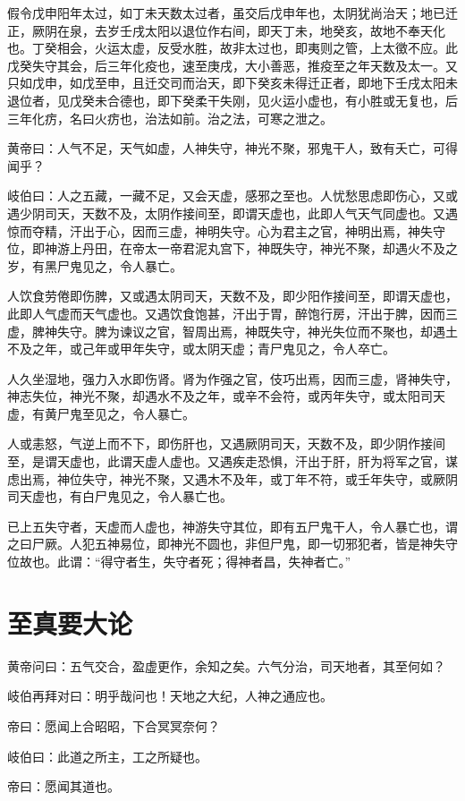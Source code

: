 \documentclass{article}%
\begin{document}
假令戊申阳年太过，如丁未天数太过者，虽交后戊申年也，太阴犹尚治天；地已迁正，厥阴在泉，去岁壬戌太阳以退位作右间，即天丁未，地癸亥，故地不奉天化也。丁癸相会，火运太虚，反受水胜，故非太过也，即夷则之管，上太徵不应。此戊癸失守其会，后三年化疫也，速至庚戌，大小善恶，推疫至之年天数及太一。又只如戊申，如戊至申，且迁交司而治天，即下癸亥未得迁正者，即地下壬戌太阳未退位者，见戊癸未合德也，即下癸柔干失刚，见火运小虚也，有小胜或无复也，后三年化疠，名曰火疠也，治法如前。治之法，可寒之泄之。

黄帝曰：人气不足，天气如虚，人神失守，神光不聚，邪鬼干人，致有夭亡，可得闻乎？

岐伯曰：人之五藏，一藏不足，又会天虚，感邪之至也。人忧愁思虑即伤心，又或遇少阴司天，天数不及，太阴作接间至，即谓天虚也，此即人气天气同虚也。又遇惊而夺精，汗出于心，因而三虚，神明失守。心为君主之官，神明出焉，神失守位，即神游上丹田，在帝太一帝君泥丸宫下，神既失守，神光不聚，却遇火不及之岁，有黑尸鬼见之，令人暴亡。

人饮食劳倦即伤脾，又或遇太阴司天，天数不及，即少阳作接间至，即谓天虚也，此即人气虚而天气虚也。又遇饮食饱甚，汗出于胃，醉饱行房，汗出于脾，因而三虚，脾神失守。脾为谏议之官，智周出焉，神既失守，神光失位而不聚也，却遇土不及之年，或己年或甲年失守，或太阴天虚；青尸鬼见之，令人卒亡。

人久坐湿地，强力入水即伤肾。肾为作强之官，伎巧出焉，因而三虚，肾神失守，神志失位，神光不聚，却遇水不及之年，或辛不会符，或丙年失守，或太阳司天虚，有黄尸鬼至见之，令人暴亡。

人或恚怒，气逆上而不下，即伤肝也，又遇厥阴司天，天数不及，即少阴作接间至，是谓天虚也，此谓天虚人虚也。又遇疾走恐惧，汗出于肝，肝为将军之官，谋虑出焉，神位失守，神光不聚，又遇木不及年，或丁年不符，或壬年失守，或厥阴司天虚也，有白尸鬼见之，令人暴亡也。

已上五失守者，天虚而人虚也，神游失守其位，即有五尸鬼干人，令人暴亡也，谓之曰尸厥。人犯五神易位，即神光不圆也，非但尸鬼，即一切邪犯者，皆是神失守位故也。此谓：“得守者生，失守者死；得神者昌，失神者亡。”
\section{至真要大论}
黄帝问曰：五气交合，盈虚更作，余知之矣。六气分治，司天地者，其至何如？

岐伯再拜对曰：明乎哉问也！天地之大纪，人神之通应也。

帝曰：愿闻上合昭昭，下合冥冥奈何？

岐伯曰：此道之所主，工之所疑也。

帝曰：愿闻其道也。
\end{document}
